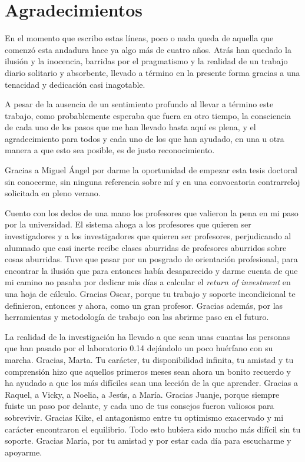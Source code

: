 \chapter*{Agradecimientos\label{cha:agradecimiento}}

En el momento que escribo estas líneas, poco o nada queda de aquella que comenzó esta andadura hace ya algo más de cuatro años. Atrás han quedado la ilusión y la inocencia, barridas por el pragmatismo y la realidad de un trabajo diario solitario y absorbente, llevado a término en la presente forma gracias a una tenacidad y dedicación casi inagotable.

A pesar de la ausencia de un sentimiento profundo al llevar a término este trabajo, como probablemente esperaba que fuera en otro tiempo, la consciencia de cada uno de los pasos que me han llevado hasta aquí es plena, y el agradecimiento para todos y cada uno de los que han ayudado, en una u otra manera a que esto sea posible, es de justo reconocimiento.

Gracias a Miguel Ángel por darme la oportunidad de empezar esta tesis doctoral sin conocerme, sin ninguna referencia sobre mí y en una convocatoria contrarreloj solicitada en pleno verano.

Cuento con los dedos de una mano los profesores que valieron la pena en mi paso por la universidad. El sistema ahoga a los profesores que quieren ser investigadores y a los investigadores que quieren ser profesores, perjudicando al alumnado que casi inerte recibe clases aburridas de profesores aburridos sobre cosas aburridas. Tuve que pasar por un posgrado de orientación profesional, para encontrar la ilusión que para entonces había desaparecido y darme cuenta de que mi camino no pasaba por dedicar mis días a calcular el \textit{return of investment} en una hoja de cálculo. Gracias Oscar, porque tu trabajo y soporte incondicional te definieron, entonces y ahora, como un gran profesor. Gracias además, por las herramientas y metodología de trabajo con las abrirme paso en el futuro.

La realidad de la investigación ha llevado a que sean unas cuantas las personas que han pasado por el laboratorio 0.14 dejándolo un poco huérfano con su marcha. Gracias, Marta. Tu carácter, tu disponibilidad infinita, tu amistad y tu comprensión hizo que aquellos primeros meses sean ahora un bonito recuerdo y ha ayudado a que los más difíciles sean una lección de la que aprender. Gracias a Raquel, a Vicky, a Noelia, a Jesús, a María. Gracias Juanje, porque siempre fuiste un paso por delante, y cada uno de tus consejos fueron valiosos para sobrevivir. Gracias Kike, el antagonismo entre tu optimismo exacervado y mi carácter encontraron el equilibrio. Todo esto hubiera sido mucho más difícil sin tu soporte. Gracias María, por tu amistad y por estar cada día para escucharme y apoyarme. 

